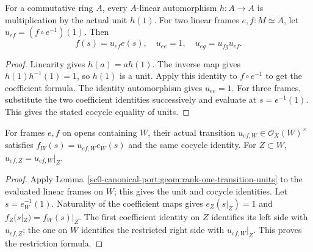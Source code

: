 \begin{lemma}
\label{sc0-canonical-port:geom:rank-one-transition-units}
\leanok
For a commutative ring \(A\), every \(A\)-linear
automorphism \(h:A\to A\) is multiplication by the actual
unit \(h(1)\). For two linear frames \(e,f:M\simeq A\),
let \(u_{ef}=(f\circ e^{-1})(1)\). Then
\[
 f(s)=u_{ef}e(s),\quad u_{ee}=1,\quad
 u_{eg}=u_{fg}u_{ef}.
\]
\end{lemma}
\begin{proof}
Linearity gives \(h(a)=a h(1)\). The inverse map gives
\(h(1)h^{-1}(1)=1\), so \(h(1)\) is a unit.
Apply this identity to \(f\circ e^{-1}\) to get the
coefficient formula. The identity automorphism gives \(u_{ee}=1\).
For three frames, substitute the two coefficient identities
successively and evaluate at \(s=e^{-1}(1)\). This gives
the stated cocycle equality of units.
\end{proof}

\begin{lemma}
\label{sc0-canonical-port:geom:sheaf-frame-transition-units}
\leanok
For frames \(e,f\) on opens containing \(W\), their actual
transition \(u_{ef,W}\in\mathcal O_X(W)^\times\) satisfies
\(f_W(s)=u_{ef,W}e_W(s)\) and the same cocycle identity.
For \(Z\subset W\), \(u_{ef,Z}=u_{ef,W}|_Z\).
\end{lemma}
\begin{proof}
Apply Lemma~\ref{sc0-canonical-port:geom:rank-one-transition-units} to the
evaluated linear frames on \(W\); this gives the unit and
cocycle identities. Let \(s=e_W^{-1}(1)\). Naturality of
the coefficient maps gives \(e_Z(s|_Z)=1\) and
\(f_Z(s|_Z)=f_W(s)|_Z\). The first coefficient identity
on \(Z\) identifies its left side with \(u_{ef,Z}\);
the one on \(W\) identifies the restricted right side with
\(u_{ef,W}|_Z\). This proves the restriction formula.
\end{proof}

